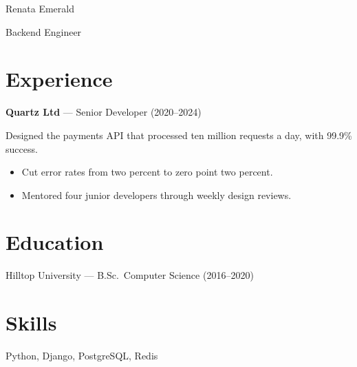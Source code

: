 \documentclass[11pt]{article}
\begin{document}
{\Huge Renata Emerald}\par
Backend Engineer\par

\section{Experience}

\textbf{Quartz Ltd} --- Senior Developer (2020--2024)

Designed the payments API that processed ten million
requests a day, with 99.9\% success.

\begin{itemize}
  \item Cut error rates from two percent to zero point two percent.
  \item Mentored four junior developers through weekly design reviews.
\end{itemize}

\section{Education}

Hilltop University --- B.Sc.~Computer Science (2016--2020)

\section{Skills}

Python, Django, PostgreSQL, Redis
\end{document}
